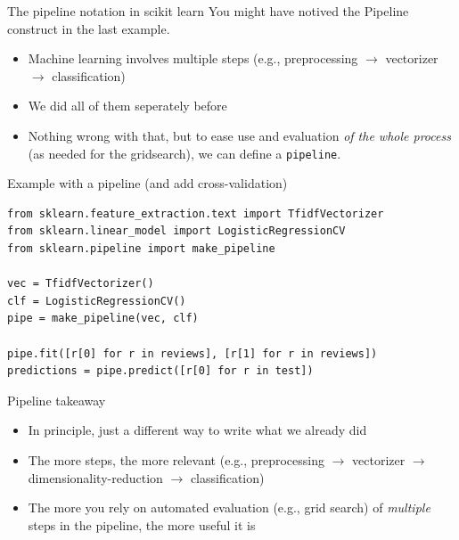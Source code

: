 \documentclass[compress]{beamer}
\begin{document}
\begin{frame}{The pipeline notation in scikit learn}
You might have notived the Pipeline construct in the last example.
	\begin{itemize}
		\item Machine learning involves multiple steps (e.g., preprocessing $\rightarrow$ vectorizer $\rightarrow$ classification)
		\item We did all of them seperately before
		\item Nothing wrong with that, but to ease use and evaluation \emph{of the whole process} (as needed for the gridsearch), we can define a \texttt{pipeline}.
	\end{itemize}
	
\end{frame}

\begin{frame}[fragile]{Example with a pipeline (and add cross-validation)}
\begin{lstlisting}
from sklearn.feature_extraction.text import TfidfVectorizer
from sklearn.linear_model import LogisticRegressionCV
from sklearn.pipeline import make_pipeline

vec = TfidfVectorizer()
clf = LogisticRegressionCV()
pipe = make_pipeline(vec, clf)

pipe.fit([r[0] for r in reviews], [r[1] for r in reviews])
predictions = pipe.predict([r[0] for r in test])
\end{lstlisting}
\end{frame}

\begin{frame}{Pipeline takeaway}
	\begin{itemize}
		\item In principle, just a different way to write what we already did
		\item The more steps, the more relevant (e.g., preprocessing $\rightarrow$ vectorizer $\rightarrow$ dimensionality-reduction $\rightarrow$ classification)
		\item The more you rely on automated evaluation (e.g., grid search) of \emph{multiple} steps in the pipeline, the more useful it is
	\end{itemize}
\end{frame}
\end{document}
